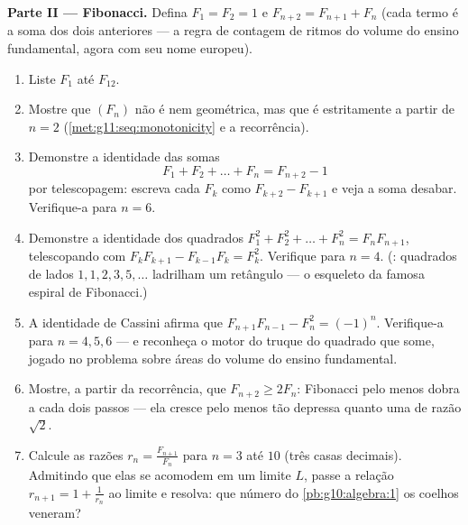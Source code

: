 \begin{problem}
\medskip
\noindent\textbf{Parte II --- Fibonacci.}
Defina $F_1 = F_2 = 1$ e $F_{n+2} = F_{n+1} + F_n$ (cada termo é a
soma dos dois anteriores --- a regra de contagem de ritmos do
volume do ensino fundamental, agora com seu nome europeu).
\begin{enumerate}[resume]
  \item Liste $F_1$ até $F_{12}$.
  \item Mostre que $(F_n)$ não é  nem
        geométrica, mas que é estritamente  a partir de
        $n = 2$ (\cref{met:g11:seq:monotonicity} e a
        recorrência).
  \item Demonstre a identidade das somas
        \[
        F_1 + F_2 + \dots + F_n = F_{n+2} - 1
        \]
        por telescopagem: escreva cada $F_k$ como
        $F_{k+2} - F_{k+1}$ e veja a soma desabar. Verifique-a
        para $n = 6$.
  \item Demonstre a identidade dos quadrados
        $F_1^2 + F_2^2 + \dots + F_n^2 = F_n F_{n+1}$,
        telescopando com
        $F_k F_{k+1} - F_{k-1} F_k = F_k^2$. Verifique para
        $n = 4$. (: quadrados de lados
        $1, 1, 2, 3, 5, \dots$ ladrilham um retângulo --- o
        esqueleto da famosa espiral de Fibonacci.)
  \item A identidade de Cassini afirma que
        $F_{n+1} F_{n-1} - F_n^2 = (-1)^n$. Verifique-a para
        $n = 4, 5, 6$ --- e reconheça o motor do truque do
        quadrado que some, jogado no problema sobre áreas do
        volume do ensino fundamental.
  \item Mostre, a partir da recorrência, que
        $F_{n+2} \geq 2 F_n$: Fibonacci pelo menos dobra a cada
        dois passos --- ela cresce pelo menos tão depressa quanto
        uma  de razão $\sqrt2$.
  \item Calcule as razões $r_n = \frac{F_{n+1}}{F_n}$ para
        $n = 3$ até $10$ (três casas decimais). Admitindo que
        elas se acomodem em um limite $L$, passe a relação
        $r_{n+1} = 1 + \frac{1}{r_n}$ ao limite e resolva: que
        número do \cref{pb:g10:algebra:1} os coelhos veneram?
\end{enumerate}


\end{problem}
